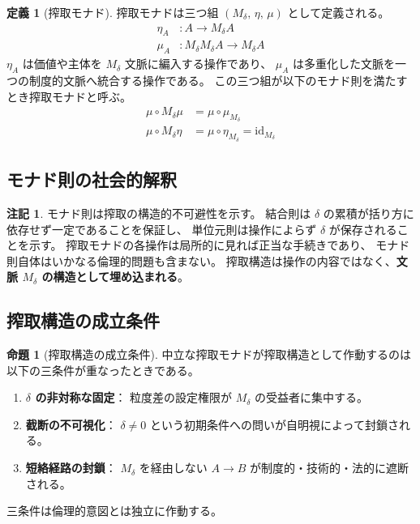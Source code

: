 \documentclass[11pt,a4paper]{ltjsarticle}
\newcommand{\Mdelta}{M_\delta}
\theoremstyle{definition}
\newtheorem{definition}{定義}[section]
\newtheorem{proposition}{命題}[section]
\newtheorem{remark}{注記}[section]
\begin{document}
\begin{definition}[搾取モナド]
搾取モナドは三つ組 $(\Mdelta,\, \eta,\, \mu)$ として定義される。
\begin{align}
\eta_A &: A \to \Mdelta A \\
\mu_A &: \Mdelta\Mdelta A \to \Mdelta A
\end{align}
$\eta_A$ は価値や主体を $\Mdelta$ 文脈に編入する操作であり、
$\mu_A$ は多重化した文脈を一つの制度的文脈へ統合する操作である。
この三つ組が以下のモナド則を満たすとき搾取モナドと呼ぶ。
\begin{align}
\mu \circ M_\delta\mu &= \mu \circ \mu_{M_\delta} \\
\mu \circ M_\delta\eta &= \mu \circ \eta_{M_\delta} = \mathrm{id}_{M_\delta}
\end{align}
\end{definition}

\subsection{モナド則の社会的解釈}

\begin{remark}
モナド則は搾取の構造的不可避性を示す。
結合則は $\delta$ の累積が括り方に依存せず一定であることを保証し、
単位元則は操作によらず $\delta$ が保存されることを示す。
搾取モナドの各操作は局所的に見れば正当な手続きであり、
モナド則自体はいかなる倫理的問題も含まない。
搾取構造は操作の内容ではなく、\textbf{文脈 $\Mdelta$ の構造として埋め込まれる}。
\end{remark}

\subsection{搾取構造の成立条件}

\begin{proposition}[搾取構造の成立条件]
中立な搾取モナドが搾取構造として作動するのは以下の三条件が重なったときである。
\begin{enumerate}
\item \textbf{$\delta$ の非対称な固定}：
  粒度差の設定権限が $\Mdelta$ の受益者に集中する。
\item \textbf{截断の不可視化}：
  $\delta \neq 0$ という初期条件への問いが自明視によって封鎖される。
\item \textbf{短絡経路の封鎖}：
  $\Mdelta$ を経由しない $A \to B$ が制度的・技術的・法的に遮断される。
\end{enumerate}
三条件は倫理的意図とは独立に作動する。
\end{proposition}
\end{document}
